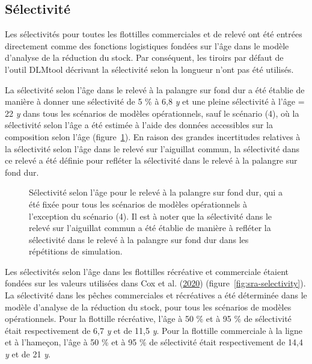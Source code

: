 \documentclass[french,11pt]{book}
\begin{document}
\subsection{Sélectivité}
\label{app:desc-fleet-selectivity-yelloweye}

Les sélectivités pour toutes les flottilles commerciales et de relevé ont été entrées directement comme des fonctions logistiques fondées sur l'âge dans le modèle d'analyse de la réduction du stock. Par conséquent, les tiroirs par défaut de l'outil DLMtool décrivant la sélectivité selon la longueur n'ont pas été utilisés.

La sélectivité selon l'âge dans le relevé à la palangre sur fond dur a été établie de manière à donner une sélectivité de 5 \% à 6,8 \emph{y} et une pleine sélectivité à l'âge = 22 \emph{y} dans tous les scénarios de modèles opérationnels, sauf le scénario (4), où la sélectivité selon l'âge a été estimée à l'aide des données accessibles sur la composition selon l'âge (figure~\ref{fig:HBLL-selectivity}). En raison des grandes incertitudes relatives à la sélectivité selon l'âge dans le relevé sur l'aiguillat commun, la sélectivité dans ce relevé a été définie pour refléter la sélectivité dans le relevé à la palangre sur fond dur.


\begin{figure}[htb]

{\centering {} 

}

\caption{Sélectivité selon l'âge pour le relevé à la palangre sur fond dur, qui a été fixée pour tous les scénarios de modèles opérationnels à l'exception du scénario (4). Il est à noter que la sélectivité dans le relevé sur l'aiguillat commun a été établie de manière à refléter la sélectivité dans le relevé à la palangre sur fond dur dans les répétitions de simulation.}\label{fig:HBLL-selectivity}
\end{figure}
Les sélectivités selon l'âge dans les flottilles récréative et commerciale étaient fondées sur les valeurs utilisées dans Cox et al. (\protect\hyperlink{ref-cox2020}{2020}) (figure~\ref{fig:sra-selectivity}). La sélectivité dans les pêches commerciales et récréatives a été déterminée dans le modèle d'analyse de la réduction du stock, pour tous les scénarios de modèles opérationnels. Pour la flottille récréative, l'âge à 50 \% et à 95 \% de sélectivité était respectivement de 6,7 \emph{y} et de 11,5 \emph{y}. Pour la flottille commerciale à la ligne et à l'hameçon, l'âge à 50 \% et à 95 \% de sélectivité était respectivement de 14,4 \emph{y} et de 21 \emph{y}.
\end{document}
